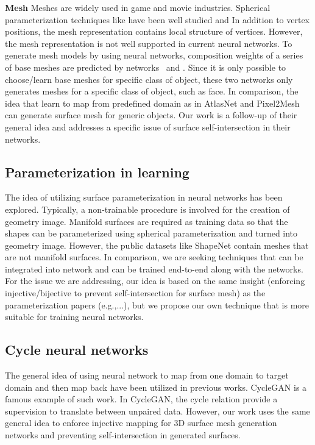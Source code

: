 \noindent\textbf{Mesh}
Meshes are widely used in game and movie industries. Spherical parameterization techniques like \cite{HuAHSP2018} have been well studied and 
In addition to vertex positions, the mesh representation contains local structure of vertices. 
However, the mesh representation is not well supported in current neural networks.
% 
To generate mesh models by using neural networks, composition weights of a series of base meshes are predicted by networks~\cite{img2mesh} and \cite{endface}. %
Since it is only possible to choose/learn base meshes for specific class of object, these two networks only generates meshes for a specific class of object, such as face.
%
In comparison, the idea that learn to map from predefined domain as in AtlasNet\cite{atlasnet} and Pixel2Mesh\cite{pixel2mesh} can generate surface mesh for generic objects. Our work is a follow-up of their general idea and addresses a specific issue of surface self-intersection in their networks.

\subsection{Parameterization in learning}
The idea of utilizing surface parameterization in neural networks has been explored\cite{surfnet,geoimg}. 
Typically, a non-trainable procedure is involved for the creation of geometry image. 
Manifold surfaces are required as training data so that the shapes can be parameterized using spherical parameterization and turned into geometry image. However, the public datasets like ShapeNet\cite{shapenetdata} contain meshes that are not manifold surfaces. 
In comparison, we are seeking techniques that can be integrated into network and can be trained end-to-end along with the networks. For the issue we are addressing, our idea is based on the same insight (enforcing injective/bijective to prevent self-intersection for surface mesh) as the parameterization papers (e.g.\cite{provableplanarmapping,lifted_bijection,freeboundary,boundeddistortion,Liu_PP_2018},...), but we propose our own technique that is more suitable for training neural networks. 

\subsection{Cycle neural networks}
The general idea of using neural network to map from one domain to target domain and then map back have been utilized in previous works. CycleGAN\cite{CycleGAN2017} is a famous example of such work. In CycleGAN\cite{CycleGAN2017}, the cycle relation provide a supervision to translate between unpaired data. However, our work uses the same general idea to enforce injective mapping for 3D surface mesh generation networks and preventing self-intersection in generated surfaces. 



